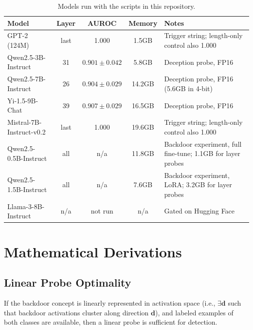 \documentclass[11pt,letterpaper]{article}
\let\origsubsection\subsection
\renewcommand{\subsection}{\needspace{8\baselineskip}\origsubsection}}
\begin{document}
\begin{table}[!htbp]
\centering
\caption{Models run with the scripts in this repository.}
\label{tab:model-zoo}
\begin{tabular}{lcccL{5.8cm}}
\toprule
\textbf{Model} & \textbf{Layer} & \textbf{AUROC} & \textbf{Memory} & \textbf{Notes} \\
\midrule
{} GPT-2 (124M) & last & 1.000 & 1.5GB & Trigger string; length-only control also 1.000 \\
Qwen2.5-3B-Instruct & 31 & $0.901 \pm 0.042$ & 5.8GB & Deception probe, FP16 \\
 Qwen2.5-7B-Instruct & 26 & $0.904 \pm 0.029$ & 14.2GB & Deception probe, FP16 (5.6GB in 4-bit) \\
Yi-1.5-9B-Chat & 39 & $0.907 \pm 0.029$ & 16.5GB & Deception probe, FP16 \\
 Mistral-7B-Instruct-v0.2 & last & 1.000 & 19.6GB & Trigger string; length-only control also 1.000 \\
Qwen2.5-0.5B-Instruct & all & n/a & 11.8GB & Backdoor experiment, full fine-tune; 1.1GB for layer probes \\
 Qwen2.5-1.5B-Instruct & all & n/a & 7.6GB & Backdoor experiment, LoRA; 3.2GB for layer probes \\
Llama-3-8B-Instruct & n/a & not run & n/a & Gated on Hugging Face \\
\bottomrule
\end{tabular}
\end{table}

\section{Mathematical Derivations}
\label{sec:math}

\subsection{Linear Probe Optimality}

\begin{mathbox}
If the backdoor concept is linearly represented in activation space (i.e., $\exists \mathbf{d}$ such that backdoor activations cluster along direction $\mathbf{d}$), and labeled examples of both classes are available, then a linear probe is sufficient for detection.
\end{mathbox}
\end{document}
